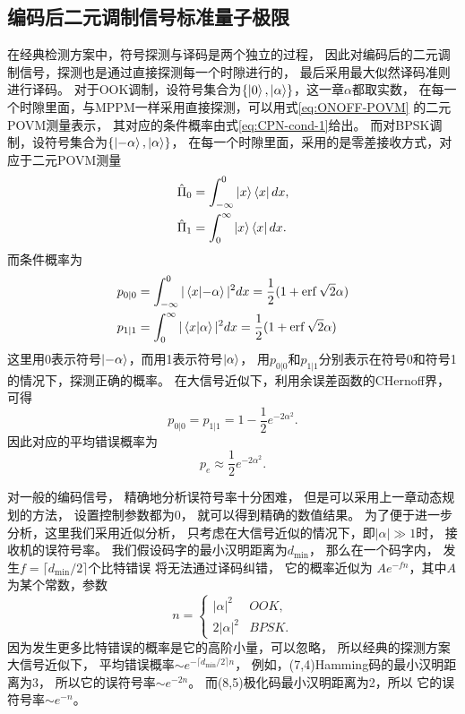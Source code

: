 \subsection{编码后二元调制信号标准量子极限}
在经典检测方案中，符号探测与译码是两个独立的过程，
因此对编码后的二元调制信号，探测也是通过直接探测每一个时隙进行的，
最后采用最大似然译码准则进行译码。
对于OOK调制，设符号集合为$\{\ket{0}, \ket{\alpha}\}$，这一章$\alpha$都取实数，
在每一个时隙里面，与MPPM一样采用直接探测，可以用式\ref{eq:ONOFF-POVM} 的二元POVM测量表示，
其对应的条件概率由式\ref{eq:CPN-cond-1}给出。
而对BPSK调制，设符号集合为$\{\ket{-\alpha}, \ket{\alpha}\}$，
在每一个时隙里面，采用的是零差接收方式，对应于二元POVM测量
\begin{equation}
\begin{split}
\hat{\Pi}_0 &= \int_{-\infty}^0 \ket{x}\bra{x} dx, \\
\hat{\Pi}_1 &= \int_0^{\infty} \ket{x}\bra{x} dx.
\end{split}
\end{equation}
而条件概率为
\begin{equation}
\begin{split}
p_{0|0} &= \int_{-\infty}^0 |\bra{x}\ket{-\alpha}|^2 dx = \frac{1}{2}(1+\erf{\sqrt{2}\alpha}) \\
p_{1|1} &= \int_0^{\infty} |\bra{x}\ket{\alpha}|^2 dx = \frac{1}{2}(1+\erf{\sqrt{2}\alpha}) 
\end{split}
\end{equation}
这里用0表示符号$\ket{-\alpha}$，而用1表示符号$\ket{\alpha}$，
用$p_{0|0}$和$p_{1|1}$分别表示在符号0和符号1的情况下，探测正确的概率。
在大信号近似下，利用余误差函数的CHernoff界\cite{chang2011chernoff}，可得
\begin{equation}
p_{0|0} = p_{1|1} = 1 - \frac{1}{2} e^{-2\alpha^2}.
\end{equation}
因此对应的平均错误概率为
\begin{equation}
p_e \approx \frac{1}{2} e^{-2\alpha^2}.
\end{equation}

对一般的编码信号，
精确地分析误符号率十分困难，
但是可以采用上一章动态规划的方法，
设置控制参数都为0，
就可以得到精确的数值结果。
为了便于进一步分析，这里我们采用近似分析，
只考虑在大信号近似的情况下，即$|\alpha| \gg 1$时，
接收机的误符号率。
我们假设码字的最小汉明距离为$d_{\min}$，
那么在一个码字内，
发生$f = \lceil d_{\min}/2 \rceil$个比特错误
将无法通过译码纠错，
它的概率近似为 $Ae^{-f n}$，其中$A$为某个常数，参数
\begin{equation}
n = \begin{cases}
        |\alpha|^2 & OOK, \\
        2|\alpha|^2 & BPSK.
    \end{cases}
\end{equation}
因为发生更多比特错误的概率是它的高阶小量，可以忽略，
所以经典的探测方案大信号近似下，
平均错误概率$\sim e^{-\lceil d_{\min}/2\rceil n}$，
例如，(7,4)Hamming码的最小汉明距离为3，
所以它的误符号率$\sim e^{-2n}$。
而(8,5)极化码最小汉明距离为2，所以
它的误符号率$\sim e^{-n}$。


